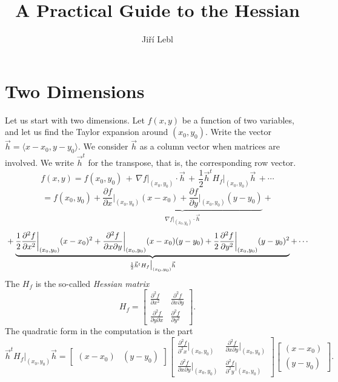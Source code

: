 \documentclass[12pt]{article}
\title{A Practical Guide to the Hessian}
\author{Ji\v{r}\'i Lebl}
\begin{document}
\maketitle

\section{Two Dimensions}

Let us start with two dimensions.
Let $f(x,y)$ be a function of two variables, and let us
find the
Taylor expansion around $(x_0,y_0)$.
Write the vector $\vec{h} = \langle x-x_0, y-y_0 \rangle$.  We
consider $\vec{h}$ as a column vector when matrices are involved.
We write $\vec{h}^t$ for the transpose, that is, the corresponding
row vector.
$$
f(x,y) = f(x_0,y_0) \, + \,
\nabla f\big|_{(x_0,y_0)} \cdot \vec{h}
\, + \,
\frac{1}{2} \vec{h}^{t} H_f\big|_{(x_0,y_0)} \vec{h} \,
+ \cdots
$$
$$
 = f(x_0,y_0) +
\underbrace{\frac{\partial f}{\partial x}\bigg|_{(x_0,y_0)} (x-x_0) +
\frac{\partial f}{\partial y}\bigg|_{(x_0,y_0)} (y-y_0)}_{\nabla
f\big|_{(x_0,y_0)} \cdot \vec{h}}
+ {}
$$
$$
{} +
\underbrace{%
\frac{1}{2} \frac{\partial^2 f}{\partial x^2}\bigg|_{(x_0,y_0)} (x-x_0)^2 +
\frac{\partial^2 f}{\partial x \partial y}\bigg|_{(x_0,y_0)} (x-x_0)(y-y_0) +
\frac{1}{2} \frac{\partial^2 f}{\partial y^2}\bigg|_{(x_0,y_0)} (y-y_0)^2}_{%
\frac{1}{2} \vec{h}^{t} H_f\big|_{(x_0,y_0)} \vec{h}}
+
\cdots
$$
The $H_f$ is the so-called \emph{Hessian matrix}
\begin{equation*}
H_f
=
\begin{bmatrix}
\frac{\partial^2 f}{\partial x^2} &
\frac{\partial^2 f}{\partial x \partial y} \\
\frac{\partial^2 f}{\partial y \partial x} &
\frac{\partial^2 f}{\partial y^2}
\end{bmatrix}
.
\end{equation*}
The quadratic form in the computation is the part
\begin{equation*}
\vec{h}^{t} H_f \big|_{(x_0,y_0)} \vec{h}
=
\begin{bmatrix}
(x-x_0) & (y-y_0)
\end{bmatrix}
\begin{bmatrix}
\frac{\partial^2 f}{\partial^2 x}\big|_{(x_0,y_0)} &
\frac{\partial^2 f}{\partial x \partial y}\big|_{(x_0,y_0)} \\
\frac{\partial^2 f}{\partial x \partial y}\big|_{(x_0,y_0)} &
\frac{\partial^2 f}{\partial^2 y}\big|_{(x_0,y_0)}
\end{bmatrix}
\begin{bmatrix}
(x-x_0) \\ (y-y_0)
\end{bmatrix}
.
\end{equation*}
\end{document}
